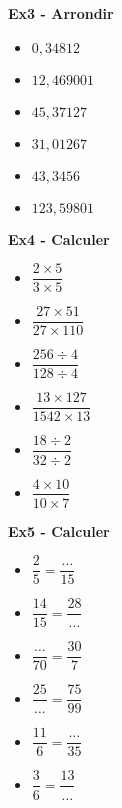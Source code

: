 \textbf{Ex3 - Arrondir}

\begin{multicols}{3}
\begin{itemize}[label={$\bullet$}]
  \item $0,34812$ \dotfill \\
  \item $12,469001$ \dotfill \\
  \item $45,37127$ \dotfill \\
  \item $31,01267$ \dotfill \\
  \item $43,3456$ \dotfill \\
  \item $123,59801$ \dotfill \\
\end{itemize}
\end{multicols}

\textbf{Ex4 - Calculer}

\begin{multicols}{3}
\begin{itemize}[label={$\bullet$}]
  \item $\dfrac{2 \times 5}{3 \times 5}$ \dotfill \\
  \item $\dfrac{27 \times 51}{27 \times  110}$ \dotfill \\
  \item $\dfrac{256 \div 4}{128 \div 4}$ \dotfill \\
  \item $\dfrac{13 \times 127}{1542 \times 13}$ \dotfill \\
  \item $\dfrac{18 \div 2}{32 \div 2}$ \dotfill \\
  \item $\dfrac{4 \times 10}{10 \times  7}$ \dotfill \\
\end{itemize}
\end{multicols}

\textbf{Ex5 - Calculer}

\begin{multicols}{3}
\begin{itemize}[label={$\bullet$}]
  \item $\dfrac{2}{5}= \dfrac{\ldots}{15}$ \\
  \item $\dfrac{14}{15}= \dfrac{28}{\ldots}$ \\
  \item $\dfrac{\ldots}{70}= \dfrac{30}{7}$ \\
  \item $\dfrac{25}{\ldots}= \dfrac{75}{99}$ \\
  \item $\dfrac{11}{6}= \dfrac{\ldots}{35}$ \\
  \item $\dfrac{3}{6}= \dfrac{13}{\ldots}$\\
\end{itemize}
\end{multicols}

